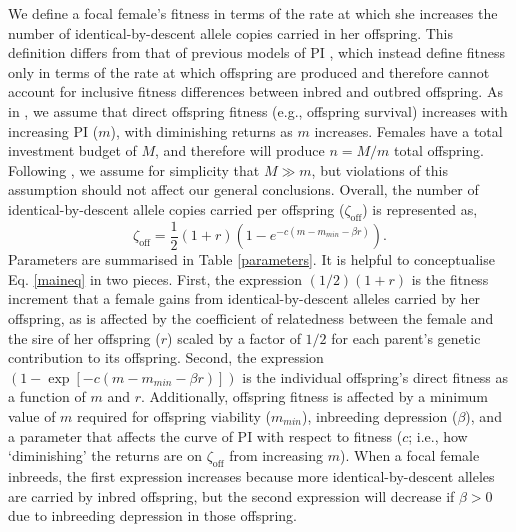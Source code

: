 \documentclass[12pt]{article}
\begin{document}
We define a focal female's fitness in terms of the rate at which she increases the number of identical-by-descent allele copies carried in her offspring. This definition differs from that of previous models of PI \cite[e.g.,][]{Macnair1978, Parker1978}, which instead define fitness only in terms of the rate at which offspring are produced and therefore cannot account for inclusive fitness differences between inbred and outbred offspring.  As in \cite{Parker1978}, we assume that direct offspring fitness (e.g., offspring survival) increases with increasing PI ($m$), with diminishing returns as $m$ increases. Females have a total investment budget of $M$, and therefore will produce $n=M/m$ total offspring. Following \cite{Parker1985}, we assume for simplicity that $M \gg m$, but violations of this assumption should not affect our general conclusions. Overall, the number of identical-by-descent allele copies carried per offspring ($\zeta_{\textrm{off}}$) is represented as,
\begin{equation} \label{maineq}
\zeta_{\textrm{off}} = \frac{1}{2}\left(1+r\right)\left(1-e^{-c\left(m-m_{min}-\beta r\right)}\right).
\end{equation}
Parameters are summarised in Table \ref{parameters}. It is helpful to conceptualise Eq. \ref{maineq} in two pieces. First, the expression $\left(1/2\right) \left(1 + r\right)$ is the fitness increment that a female gains from identical-by-descent alleles carried by her offspring, as is affected by the coefficient of relatedness between the female and the sire of her offspring ($r$) scaled by a factor of $1/2$ for each parent's genetic contribution to its offspring. Second, the expression $\left(1 - \exp\left[-c\left(m-m_{min}-\beta r\right)\right]\right)$ is the individual offspring's direct fitness as a function of $m$ and $r$. Additionally, offspring fitness is affected by a minimum value of $m$ required for offspring viability ($m_{min}$), inbreeding depression ($\beta$), and a parameter that affects the curve of PI with respect to fitness ($c$; i.e., how `diminishing' the returns are on $\zeta_{\textrm{off}}$ from increasing $m$). When a focal female inbreeds, the first expression increases because more identical-by-descent alleles are carried by inbred offspring, but the second expression will decrease if $\beta>0$ due to inbreeding depression in those offspring.
\end{document}
